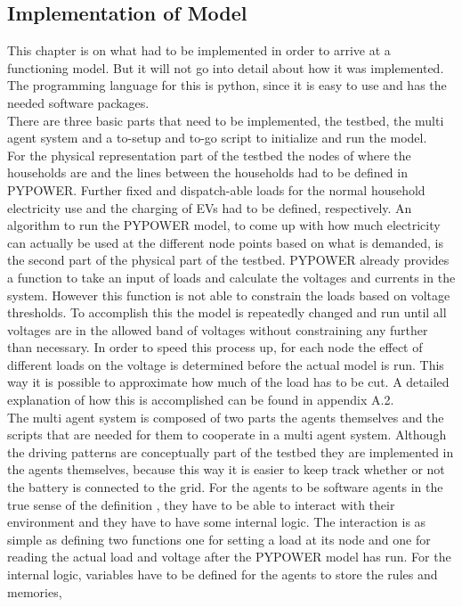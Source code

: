 \documentclass[a4paper]{article}
\begin{document}
\subsection{Implementation of Model} 
This chapter is on what had to be implemented in order to arrive at a functioning model. But it will not go into detail about how 
it was implemented. The programming language for this is python, since it is easy to use and has the needed software packages.\\
There are three basic parts that need to be implemented, the testbed, the multi agent system and a to-setup and to-go script to initialize 
and run the model. \\
For the physical representation part of the testbed the nodes of where the households are and the lines between the households had to be 
defined in PYPOWER. Further fixed and dispatch-able loads for the normal household electricity use and the charging of EVs had to be 
defined, respectively. An algorithm to run the PYPOWER model, to come up with how much electricity can actually be used at the different 
node points based on what is demanded, is the second part of the physical part of the testbed. PYPOWER already provides a function 
to take an input of loads and calculate the voltages and currents in the system. However this function is not able to constrain the 
loads based on voltage thresholds. To accomplish this the model is repeatedly changed and run until all voltages are in the allowed
band of voltages without constraining any further than necessary. In order to speed this process up, for each node the effect of different
loads on the voltage is determined before the actual model is run. This way it is possible to approximate how much of the load has to be 
cut. A detailed explanation of how this is accomplished can be found in appendix A.2. \\
The multi agent system is composed of two parts the agents themselves and the scripts that are needed for them to cooperate in a 
multi agent system. Although the driving patterns are conceptually part of the testbed they are implemented in the agents themselves, because
this way it is easier to keep track whether or not the battery is connected to the grid. For the agents to be software agents in the true
sense of the definition \cite{mas}, they have to be able to interact with their environment and they have to have some internal logic. 
The interaction is as simple as defining two functions one for setting a load at its node and one for reading the actual load and 
voltage after the PYPOWER model has run. For the internal logic, variables have to be defined for the agents to store the rules and memories, 
\end{document}
